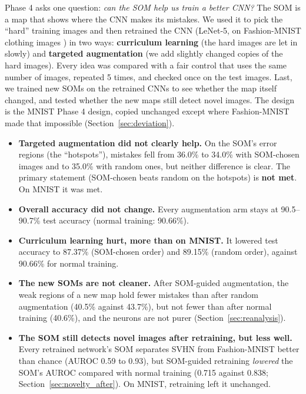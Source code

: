 \documentclass[11pt]{article}
\begin{document}
Phase 4 asks one question: \emph{can the SOM help us train a better CNN?} The SOM is a map that shows where the CNN makes its mistakes. We used it to pick the ``hard'' training images and then retrained the CNN (LeNet-5, on Fashion-MNIST clothing images \parencite{xiao2017fashion}) in two ways: \textbf{curriculum learning} (the hard images are let in slowly) and \textbf{targeted augmentation} (we add slightly changed copies of the hard images). Every idea was compared with a fair control that uses the same number of images, repeated 5 times, and checked once on the test images. Last, we trained new SOMs on the retrained CNNs to see whether the map itself changed, and tested whether the new maps still detect novel images. The design is the MNIST Phase 4 design, copied unchanged except where Fashion-MNIST made that impossible (Section~\ref{sec:deviation}).

\begin{itemize}[leftmargin=1.4em, itemsep=1pt]
  \item \textbf{Targeted augmentation did not clearly help.} On the SOM's error regions (the ``hotspots''), mistakes fell from 36.0\% to 34.0\% with SOM-chosen images and to 35.0\% with random ones, but neither difference is clear. The primary statement (SOM-chosen beats random on the hotspots) is \textbf{not met}. On MNIST it was met.
  \item \textbf{Overall accuracy did not change.} Every augmentation arm stays at 90.5--90.7\% test accuracy (normal training: 90.66\%).
  \item \textbf{Curriculum learning hurt, more than on MNIST.} It lowered test accuracy to 87.37\% (SOM-chosen order) and 89.15\% (random order), against 90.66\% for normal training.
  \item \textbf{The new SOMs are not cleaner.} After SOM-guided augmentation, the weak regions of a new map hold fewer mistakes than after random augmentation (40.5\% against 43.7\%), but not fewer than after normal training (40.6\%), and the neurons are not purer (Section~\ref{sec:reanalysis}).
  \item \textbf{The SOM still detects novel images after retraining, but less well.} Every retrained network's SOM separates SVHN from Fashion-MNIST better than chance (AUROC 0.59 to 0.93), but SOM-guided retraining \emph{lowered} the SOM's AUROC compared with normal training (0.715 against 0.838; Section~\ref{sec:novelty_after}). On MNIST, retraining left it unchanged.
\end{itemize}
\end{document}
